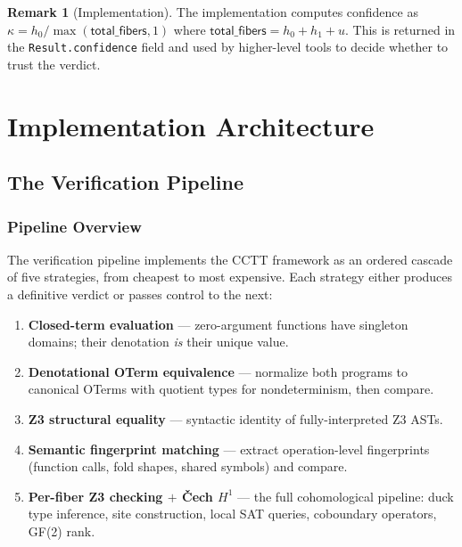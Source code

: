 \documentclass[11pt,a4paper]{report}
\theoremstyle{definition}
\newtheorem{remark}[definition]{Remark}
\theoremstyle{plain}
\newcommand{\Hone}{H^1}
\begin{document}
\begin{remark}[Implementation]
The implementation computes confidence as
$\kappa = h_0 / \max(\mathsf{total\_fibers}, 1)$ where
$\mathsf{total\_fibers} = h_0 + h_1 + u$.  This is returned in the
\texttt{Result.confidence} field and used by higher-level tools to
decide whether to trust the verdict.
\end{remark}


\part{Implementation Architecture}

\chapter{The Verification Pipeline}
\label{ch:pipeline}

\section{Pipeline Overview}

The verification pipeline implements the CCTT framework as an
ordered cascade of five strategies, from cheapest to most expensive.
Each strategy either produces a definitive verdict or passes control
to the next:

\begin{enumerate}
  \item[\textbf{S0.}] \textbf{Closed-term evaluation} ---
    zero-argument functions have singleton domains; their denotation
    \emph{is} their unique value.
  \item[\textbf{S1.}] \textbf{Denotational OTerm equivalence} ---
    normalize both programs to canonical OTerms with quotient types
    for nondeterminism, then compare.
  \item[\textbf{S2.}] \textbf{Z3 structural equality} ---
    syntactic identity of fully-interpreted Z3 ASTs.
  \item[\textbf{S3.}] \textbf{Semantic fingerprint matching} ---
    extract operation-level fingerprints
    (function calls, fold shapes, shared symbols) and compare.
  \item[\textbf{S4.}] \textbf{Per-fiber Z3 checking $+$ \v{C}ech
    $\Hone$} ---
    the full cohomological pipeline: duck type inference, site
    construction, local SAT queries, coboundary operators, GF(2)
    rank.
\end{enumerate}
\end{document}
